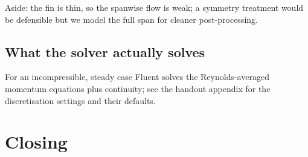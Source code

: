 \documentclass[10pt,a4paper]{article}
\begin{document}
\begin{asid}
{\small\color{MidGrey}Aside: the fin is thin, so the spanwise flow is
weak; a symmetry treatment would be defensible but we model the full
span for cleaner post-processing.}
\end{asid}

\subsection{What the solver actually solves}

For an incompressible, steady case Fluent solves the Reynolds-averaged
momentum equations plus continuity; see the handout appendix for the
discretisation settings and their defaults.

\section{Closing}

\end{document}
